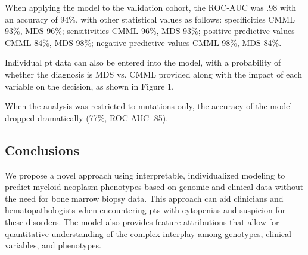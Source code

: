 When applying the model to the validation cohort, the ROC-AUC was .98 with an accuracy of 94\%, with other statistical values as follows: specificities CMML 93\%, MDS 96\%; sensitivities CMML 96\%, MDS 93\%; positive predictive values CMML 84\%, MDS 98\%; negative predictive values CMML 98\%, MDS 84\%.

Individual pt data can also be entered into the model, with a probability of whether the diagnosis is MDS vs. CMML provided along with the impact of each variable on the decision, as shown in Figure 1.

When the analysis was restricted to mutations only, the accuracy of the model dropped dramatically (77\%, ROC-AUC .85).


\subsection{Conclusions}%

We propose a novel approach using interpretable, individualized modeling to predict myeloid neoplasm phenotypes based on genomic and clinical data without the need for bone marrow biopsy data. This approach can aid clinicians and hematopathologists when encountering pts with cytopenias and suspicion for these disorders. The model also provides feature attributions that allow for quantitative understanding of the complex interplay among genotypes, clinical variables, and phenotypes.



